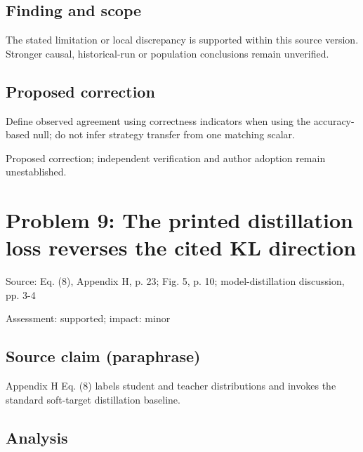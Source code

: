 \documentclass[11pt]{article}
\begin{document}
\subsection*{Finding and scope}

The stated limitation or local discrepancy is supported within this source version. Stronger causal, historical-run or population conclusions remain unverified.

\subsection*{Proposed correction}

Define observed agreement using correctness indicators when using the accuracy-based null; do not infer strategy transfer from one matching scalar.

Proposed correction; independent verification and author adoption remain unestablished.

\section*{Problem 9: The printed distillation loss reverses the cited KL direction}

Source: Eq. (8), Appendix H, p. 23; Fig. 5, p. 10; model-distillation discussion, pp. 3-4

Assessment: supported; impact: minor

\subsection*{Source claim (paraphrase)}

Appendix H Eq. (\(8\)) labels student and teacher distributions and invokes the standard soft-target distillation baseline.

\subsection*{Analysis}
\end{document}
